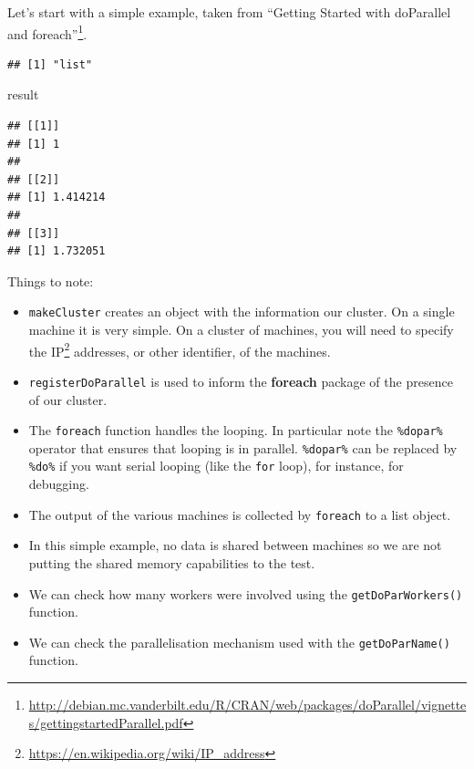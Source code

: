 \documentclass[]{book}
\newenvironment{Shaded}{\begin{snugshade}}{\end{snugshade}}
\newcommand{\DataTypeTok}[1]{\textcolor[rgb]{0.13,0.29,0.53}{#1}}
\newcommand{\DecValTok}[1]{\textcolor[rgb]{0.00,0.00,0.81}{#1}}
\newcommand{\KeywordTok}[1]{\textcolor[rgb]{0.13,0.29,0.53}{\textbf{#1}}}
\newcommand{\NormalTok}[1]{#1}
\newcommand{\OperatorTok}[1]{\textcolor[rgb]{0.81,0.36,0.00}{\textbf{#1}}}
\newcommand{\StringTok}[1]{\textcolor[rgb]{0.31,0.60,0.02}{#1}}
\providecommand{\tightlist}{%
  \setlength{\itemsep}{0pt}\setlength{\parskip}{0pt}}
\renewcommand{\href}[2]{#2\footnote{\url{#1}}}
\theoremstyle{definition}
\theoremstyle{definition}
\theoremstyle{definition}
\theoremstyle{remark}
\begin{document}
Let's start with a simple example, taken from \href{http://debian.mc.vanderbilt.edu/R/CRAN/web/packages/doParallel/vignettes/gettingstartedParallel.pdf}{``Getting Started with doParallel and foreach''}.

\begin{Shaded}
\end{Shaded}

\begin{verbatim}
## [1] "list"
\end{verbatim}

\begin{Shaded}
\begin{Highlighting}[]
\NormalTok{result}
\end{Highlighting}
\end{Shaded}

\begin{verbatim}
## [[1]]
## [1] 1
## 
## [[2]]
## [1] 1.414214
## 
## [[3]]
## [1] 1.732051
\end{verbatim}

Things to note:

\begin{itemize}
\tightlist
\item
  \texttt{makeCluster} creates an object with the information our cluster.
  On a single machine it is very simple. On a cluster of machines, you will need to specify the \href{https://en.wikipedia.org/wiki/IP_address}{IP} addresses, or other identifier, of the machines.
\item
  \texttt{registerDoParallel} is used to inform the \textbf{foreach} package of the presence of our cluster.
\item
  The \texttt{foreach} function handles the looping. In particular note the \texttt{\%dopar\%} operator that ensures that looping is in parallel. \texttt{\%dopar\%} can be replaced by \texttt{\%do\%} if you want serial looping (like the \texttt{for} loop), for instance, for debugging.
\item
  The output of the various machines is collected by \texttt{foreach} to a list object.
\item
  In this simple example, no data is shared between machines so we are not putting the shared memory capabilities to the test.
\item
  We can check how many workers were involved using the \texttt{getDoParWorkers()} function.
\item
  We can check the parallelisation mechanism used with the \texttt{getDoParName()} function.
\end{itemize}
\end{document}
